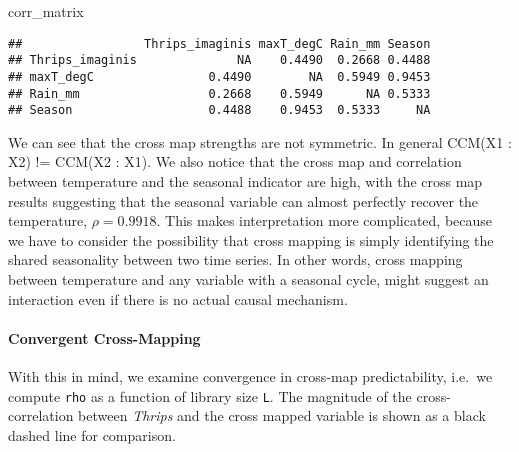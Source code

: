 \documentclass[]{article}
\newenvironment{Shaded}{\begin{snugshade}}{\end{snugshade}}
\newcommand{\NormalTok}[1]{#1}
\let\oldparagraph\paragraph
\renewcommand{\paragraph}[1]{\oldparagraph{#1}\mbox{}}
\begin{document}
\begin{Shaded}
\begin{Highlighting}[]
\NormalTok{corr_matrix}
\end{Highlighting}
\end{Shaded}

\begin{verbatim}
##                 Thrips_imaginis maxT_degC Rain_mm Season
## Thrips_imaginis              NA    0.4490  0.2668 0.4488
## maxT_degC                0.4490        NA  0.5949 0.9453
## Rain_mm                  0.2668    0.5949      NA 0.5333
## Season                   0.4488    0.9453  0.5333     NA
\end{verbatim}

We can see that the cross map strengths are not symmetric. In general
CCM(X1 : X2) != CCM(X2 : X1). We also notice that the cross map and
correlation between temperature and the seasonal indicator are high,
with the cross map results suggesting that the seasonal variable can
almost perfectly recover the temperature, \(\rho = 0.9918\). This makes
interpretation more complicated, because we have to consider the
possibility that cross mapping is simply identifying the shared
seasonality between two time series. In other words, cross mapping
between temperature and any variable with a seasonal cycle, might
suggest an interaction even if there is no actual causal mechanism.

\hypertarget{convergent-cross-mapping}{%
\paragraph{Convergent Cross-Mapping}\label{convergent-cross-mapping}}

With this in mind, we examine convergence in cross-map predictability,
i.e.~we compute \texttt{rho} as a function of library size \texttt{L}.
The magnitude of the cross-correlation between \emph{Thrips} and the
cross mapped variable is shown as a black dashed line for comparison.
\end{document}
